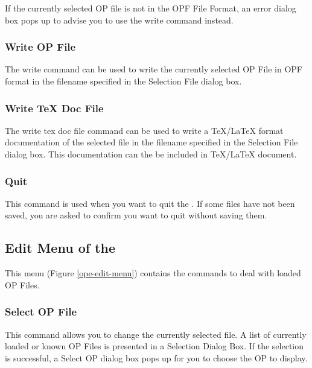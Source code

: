 If the currently selected OP file is not in the OPF File Format, an error
dialog box pops up to advise you to use the write command instead.

\subsubsection{Write OP File}

The write command can be used to write the currently selected OP File in OPF
format in the filename specified in the Selection File dialog box.

\subsubsection{Write TeX Doc File}

The write tex doc file command can be used to write a \TeX{}/\LaTeX{} format documentation
of the selected file in the filename specified in the Selection File dialog
box. This documentation can the be included in \TeX{}/\LaTeX{} document.

\subsubsection{Quit}

This command is used when you want to quit the \OPEditor. If some files
have not been saved, you are asked to confirm you want to quit
without saving them.

\subsection{Edit Menu of the \OPE{}}


This menu (Figure \ref{ope-edit-menu}) contains the commands to deal with
loaded OP Files. 



\subsubsection{Select OP File}

This command allows you to change the currently selected file. A list of
currently loaded or known OP Files is presented in a Selection Dialog Box. If
the selection is successful, a Select OP dialog box pops up for you to choose
the OP to display.

